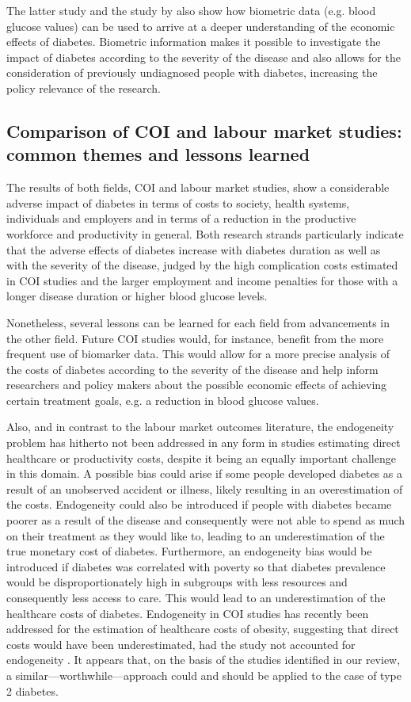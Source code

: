 The latter study and the study by \textcite{Liu2014} also show how biometric data (e.g. blood glucose values) can be used to arrive at a deeper understanding of the economic effects of diabetes. Biometric information makes it possible to investigate the impact of diabetes according to the severity of the disease and also allows for the consideration of previously undiagnosed people with diabetes, increasing the policy relevance of the research.

\subsection{Comparison of COI and labour market studies: common themes and lessons learned}
The results of both fields, \ac{COI} and labour market studies, show a considerable adverse impact of diabetes in terms of costs to society, health systems, individuals and employers and in terms of a reduction in the productive workforce and productivity in general. Both research strands particularly indicate that the adverse effects of diabetes increase with diabetes duration as well as with the severity of the disease, judged by the high complication costs estimated in \ac{COI} studies and the larger employment and income penalties for those with a longer disease duration or higher blood glucose levels. 

Nonetheless, several lessons can be learned for each field from advancements in the other field. Future \ac{COI} studies would, for instance, benefit from the more frequent use of biomarker data. This would allow for a more precise analysis of the costs of diabetes according to the severity of the disease and help inform researchers and policy makers about the possible economic effects of achieving certain treatment goals, e.g. a reduction in blood glucose values.

Also, and in contrast to the labour market outcomes literature, the endogeneity problem has hitherto not been addressed in any form in studies estimating direct healthcare or productivity costs, despite it being an equally important challenge in this domain. A possible bias could arise if some people developed diabetes as a result of an unobserved accident or illness, likely resulting in an overestimation of the costs. Endogeneity could also be introduced if people with diabetes became poorer as a result of the disease and consequently were not able to spend as much on their treatment as they would like to, leading to an underestimation of the true monetary cost of diabetes. Furthermore, an endogeneity bias would be introduced if diabetes was correlated with poverty so that diabetes prevalence would be disproportionately high in subgroups with less resources and consequently less access to care. This would lead to an underestimation of the healthcare costs of diabetes. Endogeneity in \ac{COI} studies has recently been addressed for the estimation of healthcare costs of obesity, suggesting that direct costs would have been underestimated, had the study not accounted for endogeneity \parencite{Cawley2012b}. It appears that, on the basis of the studies identified in our review, a similar---worthwhile---approach could and should be applied to the case of type 2 diabetes.

